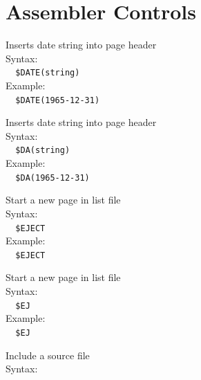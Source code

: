 \documentclass[a4paper,twoside,12pt]{book}
\newcommand{\mysmallfont}{\fontsize{8pt}{10pt} \selectfont{}}
\begin{document}
	\twocolumn
	\section{Assembler Controls}
		\begin{description}
			\mysmallfont{}
			\item[\$date] Inserts date string into page header\\
				Syntax:\\
				\verb'  '{\color{highlight_control}\verb'$DATE'}{\color{highlight_symbol}\verb'('}{\color{highlight_string}\verb'string'}{\color{highlight_symbol}\verb')'}\\
				Example:\\
				\verb'  '{\color{highlight_control}\verb'$DATE'}{\color{highlight_symbol}\verb'('}{\color{highlight_string}\verb'1965-12-31'}{\color{highlight_symbol}\verb')'}\\
			\item[\$da] Inserts date string into page header\\
				Syntax:\\
				\verb'  '				{\color{highlight_control}\verb'$DA'}{\color{highlight_symbol}\verb'('}{\color{highlight_string}\verb'string'}{\color{highlight_symbol}\verb')'}\\
				Example:\\
				\verb'  '				{\color{highlight_control}\verb'$DA'}{\color{highlight_symbol}\verb'('}{\color{highlight_string}\verb'1965-12-31'}{\color{highlight_symbol}\verb')'}\\
			\item[\$eject] Start a new page in list file\\
				Syntax:\\
				\verb'  '{\color{highlight_control}\verb'$EJECT'}\\
				Example:\\
				\verb'  '{\color{highlight_control}\verb'$EJECT'}\\
			\item[\$ej] Start a new page in list file\\
				Syntax:\\
				\verb'  '{\color{highlight_control}\verb'$EJ'}\\
				Example:\\
				\verb'  '{\color{highlight_control}\verb'$EJ'}\\
			\item[\$include] Include a source file\\
				Syntax:\\

\end{description}
\end{document}
